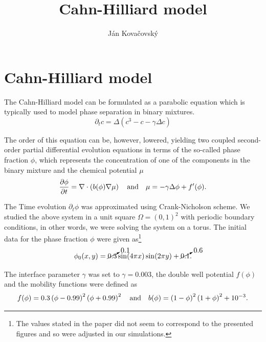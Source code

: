 \documentclass{article} %
\title{Cahn-Hilliard model}
\author{Ján Kovačovský}
\begin{document}
\section*{Cahn-Hilliard model}

The Cahn-Hilliard model can be formulated as a parabolic equation which is typically used to model phase separation in binary mixtures.
\begin{equation*}
    \partial_t c = \Delta \left(c^3 - c - \gamma \Delta c\right)
\end{equation*}

The order of this equation can be, however, lowered, yielding two coupled second-order partial differential evolution equations in terms of the so-called phase fraction $\phi$, which represents the concentration of one of the components in the binary mixture and the chemical potential $\mu$
\begin{equation}
    \frac{\partial \phi}{\partial t} = \nabla \cdot \left( b(\phi) \nabla \mu \right) \qq{and} \mu = -\gamma \Delta \phi + f'(\phi).
\end{equation}

The Time evolution $\partial_t \phi$ was approximated using Crank-Nicholson scheme. We studied the above system in a unit square $\Omega = (0, 1)^2$ with periodic boundary conditions, in other words, we were solving the system on a torus. The initial data for the phase fraction $\phi$ were given as\footnote{The values stated in the paper did not seem to correspond to the presented figures and so were adjusted in our simulations.}
\begin{equation}
    \phi_0 (x, y) = \cancelto{0.1}{0.3} \sin(4\pi x) \sin(2 \pi y) + \cancelto{0.6}{0.1}.
\end{equation}

The interface parameter $\gamma$ was set to $\gamma = 0.003$, the double well potential $f(\phi)$ and the mobility functions were defined as
\begin{equation}
    f(\phi) = 0.3 \left(\phi - 0.99\right)^2 \left(\phi + 0.99\right)^2 \qq{and} b(\phi) = \left(1 - \phi\right)^2 \left(1 + \phi\right)^2 + 10^{-3}.
\end{equation}

\end{document}
